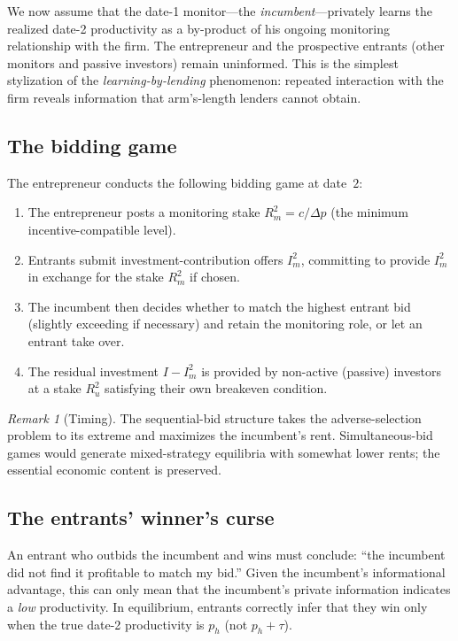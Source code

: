 \documentclass[11pt,a4paper,oneside]{book}
\theoremstyle{plain}
\theoremstyle{definition}
\theoremstyle{remark}
\newtheorem{remark}[theorem]{Remark}
\numberwithin{equation}{chapter}
\begin{document}
We now assume that the date-1 monitor---the \emph{incumbent}---privately learns the realized date-2 productivity as a by-product of his ongoing monitoring relationship with the firm.
The entrepreneur and the prospective entrants (other monitors and passive investors) remain uninformed.
This is the simplest stylization of the \emph{learning-by-lending} phenomenon: repeated interaction with the firm reveals information that arm's-length lenders cannot obtain.

\subsection{The bidding game}

The entrepreneur conducts the following bidding game at date~$2$:
\begin{enumerate}
  \item The entrepreneur posts a monitoring stake $R_m^2 = c/\Delta p$ (the minimum incentive-compatible level).
  \item Entrants submit investment-contribution offers $I_m^2$, committing to provide $I_m^2$ in exchange for the stake $R_m^2$ if chosen.
  \item The incumbent then decides whether to match the highest entrant bid (slightly exceeding if necessary) and retain the monitoring role, or let an entrant take over.
  \item The residual investment $I - I_m^2$ is provided by non-active (passive) investors at a stake $R_u^2$ satisfying their own breakeven condition.
\end{enumerate}

\begin{remark}[Timing]\label{rem:mon-timing}
The sequential-bid structure takes the adverse-selection problem to its extreme and maximizes the incumbent's rent.
Simultaneous-bid games would generate mixed-strategy equilibria with somewhat lower rents; the essential economic content is preserved.
\end{remark}

\subsection{The entrants' winner's curse}

An entrant who outbids the incumbent and wins must conclude: ``the incumbent did not find it profitable to match my bid.''
Given the incumbent's informational advantage, this can only mean that the incumbent's private information indicates a \emph{low} productivity.
In equilibrium, entrants correctly infer that they win only when the true date-2 productivity is $p_h$ (not $p_h + \tau$).
\end{document}
